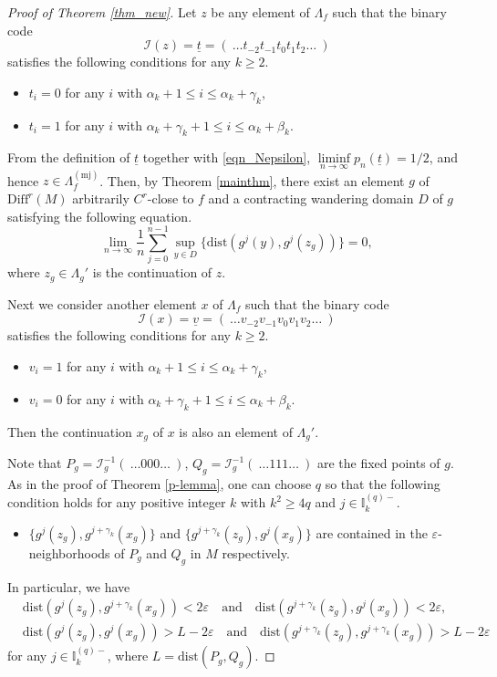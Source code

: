 \documentclass{amsart}
\theoremstyle{definition}
\numberwithin{equation}{section}
\numberwithin{figure}{section}
\begin{document}
\begin{proof}[Proof of Theorem \ref{thm_new}]
Let $z$ be any element of $\Lambda_f$ such that the binary code
$$\mathcal{I}(z)=\underline t=(\ \dots t_{-2}t_{-1}t_0t_1t_2\dots\ )$$
satisfies the following conditions for any $k\geq 2$.
\begin{itemize}
\item
$t_i=0$ for any $i$ with $\alpha_k+1\leq i\leq \alpha_k+\gamma_k$, 
\item 
$t_i=1$ for any $i$ with $\alpha_k+\gamma_k+1\leq i\leq \alpha_k+\beta_k$. 
\end{itemize}
From the definition of $\underline t$ together with \eqref{eqn_Nepsilon}, $\liminf\limits_{n\to\infty}p_n(\underline t)=1/2$, 
and hence $z\in \Lambda_f^{(\mathrm{mj})}$.
Then, by Theorem \ref{mainthm}, there exist an element $g$ of $\mathrm{Diff}^r(M)$ arbitrarily $C^r$-close to 
$f$ and a contracting wandering domain $D$ of $g$ satisfying the following equation.
\begin{equation}\label{eqn_g(z)}
\lim_{n\rightarrow \infty} \frac1{n}\sum_{j=0}^{n-1}\sup_{y\in D}\bigl\{\mathrm{dist}(g^j(y),g^j(z_g))\bigr\}=0,
\end{equation}
where $z_g\in \Lambda_g'$ is the continuation of $z$.

Next we consider another element $x$ of $\Lambda_f$ such that the binary code 
$$\mathcal{I}(x)=\underline v=(\ \dots v_{-2}v_{-1}v_0v_1v_2\dots\ )$$
satisfies the following conditions for any $k\geq 2$.
\begin{itemize}
\item
$v_i=1$ for any $i$ with $\alpha_k+1\leq i\leq \alpha_k+\gamma_k$,
\item 
$v_i=0$ for any $i$ with $\alpha_k+\gamma_k+1\leq i\leq \alpha_k+\beta_k$.
\end{itemize}
Then the continuation $x_g$ of $x$ is also an element of $\Lambda_g'$.

Note that $P_g=\mathcal{I}_g^{-1}(\ \dots 000\dots\ )$, $Q_g=\mathcal{I}_g^{-1}(\ \dots 111\dots\ )$ 
are the fixed points of $g$.
As in the proof of Theorem \ref{p-lemma}, one can choose $q$ so that the following 
condition holds for any positive integer $k$ with $k^2\geq 4q$ and $j\in \mathbb{I}_k^{(q)-}$.
\begin{itemize}
\item
$\{g^j(z_g),g^{j+\gamma_k}(x_g)\}$ and $\{g^{j+\gamma_k}(z_g),g^{j}(x_g)\}$ are contained in the $\varepsilon$-neighborhoods 
of $P_g$ and $Q_g$ in $M$ respectively.
\end{itemize}
In particular, we have 
\begin{align}
&\mathrm{dist}(g^j(z_g), g^{j+\gamma_k}(x_g))<2\varepsilon\quad\text{and}
\quad\mathrm{dist}(g^{j+\gamma_k}(z_g), g^{j}(x_g)) <2\varepsilon,\label{eqn_2e}\\
&\mathrm{dist}(g^j(z_g), g^{j}(x_g))>L-2\varepsilon\quad\text{and}
\quad\mathrm{dist}(g^{j+\gamma_k}(z_g), g^{j+\gamma_k}(x_g)) >L-2\varepsilon\label{eqn_L-2e}
\end{align}
for any $j\in \mathbb{I}_k^{(q)-}$, 
where $L=\mathrm{dist}(P_g,Q_g)$.



\end{proof}
\end{document}
